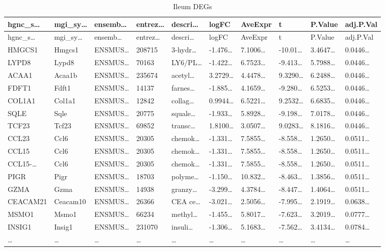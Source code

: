 \documentclass[
]{article}
\begin{document}
\begin{longtable}[]{@{}llllllllll@{}}
\caption{\label{tab:Ileum-DEGs}Ileum DEGs}\tabularnewline
\toprule
hgnc\_s\ldots{} & mgi\_sy\ldots{} & ensemb\ldots{} & entrez\ldots{} & descri\ldots{} & logFC & AveExpr & t & P.Value & adj.P.Val\tabularnewline
\midrule
\endfirsthead
\toprule
hgnc\_s\ldots{} & mgi\_sy\ldots{} & ensemb\ldots{} & entrez\ldots{} & descri\ldots{} & logFC & AveExpr & t & P.Value & adj.P.Val\tabularnewline
\midrule
\endhead
HMGCS1 & Hmgcs1 & ENSMUS\ldots{} & 208715 & 3-hydr\ldots{} & -1.476\ldots{} & 7.1006\ldots{} & -10.01\ldots{} & 3.4647\ldots{} & 0.0446\ldots{}\tabularnewline
LYPD8 & Lypd8 & ENSMUS\ldots{} & 70163 & LY6/PL\ldots{} & -1.422\ldots{} & 6.7523\ldots{} & -9.413\ldots{} & 5.7988\ldots{} & 0.0446\ldots{}\tabularnewline
ACAA1 & Acaa1b & ENSMUS\ldots{} & 235674 & acetyl\ldots{} & 3.2729\ldots{} & 4.4478\ldots{} & 9.3290\ldots{} & 6.2488\ldots{} & 0.0446\ldots{}\tabularnewline
FDFT1 & Fdft1 & ENSMUS\ldots{} & 14137 & farnes\ldots{} & -1.885\ldots{} & 4.1659\ldots{} & -9.280\ldots{} & 6.5253\ldots{} & 0.0446\ldots{}\tabularnewline
COL1A1 & Col1a1 & ENSMUS\ldots{} & 12842 & collag\ldots{} & 0.9944\ldots{} & 6.5221\ldots{} & 9.2532\ldots{} & 6.6835\ldots{} & 0.0446\ldots{}\tabularnewline
SQLE & Sqle & ENSMUS\ldots{} & 20775 & squale\ldots{} & -1.933\ldots{} & 5.8928\ldots{} & -9.198\ldots{} & 7.0178\ldots{} & 0.0446\ldots{}\tabularnewline
TCF23 & Tcf23 & ENSMUS\ldots{} & 69852 & transc\ldots{} & 1.8100\ldots{} & 3.0507\ldots{} & 9.0283\ldots{} & 8.1816\ldots{} & 0.0446\ldots{}\tabularnewline
CCL23 & Ccl6 & ENSMUS\ldots{} & 20305 & chemok\ldots{} & -1.331\ldots{} & 7.5855\ldots{} & -8.558\ldots{} & 1.2650\ldots{} & 0.0511\ldots{}\tabularnewline
CCL15 & Ccl6 & ENSMUS\ldots{} & 20305 & chemok\ldots{} & -1.331\ldots{} & 7.5855\ldots{} & -8.558\ldots{} & 1.2650\ldots{} & 0.0511\ldots{}\tabularnewline
CCL15-\ldots{} & Ccl6 & ENSMUS\ldots{} & 20305 & chemok\ldots{} & -1.331\ldots{} & 7.5855\ldots{} & -8.558\ldots{} & 1.2650\ldots{} & 0.0511\ldots{}\tabularnewline
PIGR & Pigr & ENSMUS\ldots{} & 18703 & polyme\ldots{} & -1.150\ldots{} & 10.832\ldots{} & -8.463\ldots{} & 1.3856\ldots{} & 0.0511\ldots{}\tabularnewline
GZMA & Gzma & ENSMUS\ldots{} & 14938 & granzy\ldots{} & -3.299\ldots{} & 4.3784\ldots{} & -8.447\ldots{} & 1.4064\ldots{} & 0.0511\ldots{}\tabularnewline
CEACAM21 & Ceacam10 & ENSMUS\ldots{} & 26366 & CEA ce\ldots{} & -3.021\ldots{} & 2.5056\ldots{} & -7.995\ldots{} & 2.1919\ldots{} & 0.0638\ldots{}\tabularnewline
MSMO1 & Msmo1 & ENSMUS\ldots{} & 66234 & methyl\ldots{} & -1.455\ldots{} & 5.8017\ldots{} & -7.623\ldots{} & 3.2019\ldots{} & 0.0777\ldots{}\tabularnewline
INSIG1 & Insig1 & ENSMUS\ldots{} & 231070 & insuli\ldots{} & -1.306\ldots{} & 5.1683\ldots{} & -7.562\ldots{} & 3.4134\ldots{} & 0.0784\ldots{}\tabularnewline
\ldots{} & \ldots{} & \ldots{} & \ldots{} & \ldots{} & \ldots{} & \ldots{} & \ldots{} & \ldots{} & \ldots{}\tabularnewline
\bottomrule
\end{longtable}
\end{document}
